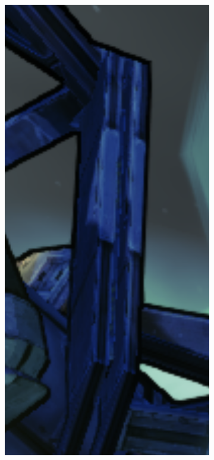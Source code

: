 \documentclass[withindex, glossary]{cam-thesis}
\begin{document}
\begin{figure}[!htbp]
    \centering
    \begin{subfigure}[b]{0.3\textwidth}
        \includegraphics[width=\textwidth]{figures/ss2off.png}

\end{subfigure}
\end{figure}
\end{document}
